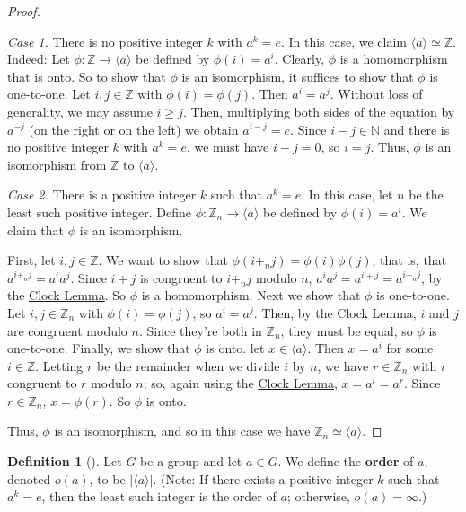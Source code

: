 \documentclass[10pt,]{book}
\newcommand{\terminology}[1]{\textbf{#1}}
\theoremstyle{plain}
\theoremstyle{definition}
\newtheorem{definition}[theorem]{Definition}
\theoremstyle{definition}
\theoremstyle{definition}
\theoremstyle{definition}
\numberwithin{equation}{section}
\def\Z{\mathbb{Z}}
\def\N{\mathbb{N}}
\begin{document}
\begin{proof}\hypertarget{proof-23}{}
\emph{Case 1.} There is no positive integer \(k\) with \(a^k=e\). In this case, we claim \(\langle a\rangle \simeq \Z\). Indeed: Let \(\phi:\Z\to \langle a\rangle\) be defined by \(\phi(i)=a^i\). Clearly, \(\phi\) is a homomorphism that is onto. So to show that \(\phi\) is an isomorphism, it suffices to show that \(\phi\) is one-to-one. Let \(i,j\in \Z\) with \(\phi(i)=\phi(j)\). Then \(a^i=a^j\). Without loss of generality, we may assume \(i\geq j\). Then, multiplying both sides of the equation by \(a^{-j}\) (on the right or on the left) we obtain \(a^{i-j}=e\). Since \(i-j\in \N\) and there is no positive integer \(k\) with \(a^k=e\), we must have \(i-j=0\), so \(i=j\). Thus, \(\phi\) is an isomorphism from \(\Z\) to \(\langle a\rangle\).%
\par
\emph{Case 2.}  There is a positive integer \(k\) such that \(a^k=e\). In this case, let \(n\) be the least such positive integer. Define \(\phi:\Z_n\to \langle a\rangle\) be defined by \(\phi(i)=a^i\). We claim that \(\phi\) is an isomorphism.%
\par
First, let \(i,j\in \Z\). We want to show that \(\phi(i+_nj)=\phi(i)\phi(j)\), that is, that \(a^{i+_nj}=a^ia^j\). Since \(i+j\) is congruent to \(i+_nj\) modulo \(n\), \(a^ia^j=a^{i+j}=a^{i+_nj}\), by the \hyperref[clock]{Clock Lemma}. So \(\phi\) is a homomorphism. Next we show that \(\phi\) is one-to-one. Let \(i,j\in \Z_n\) with \(\phi(i)=\phi(j)\), so \(a^i=a^j\). Then, by the Clock Lemma, \(i\) and \(j\) are congruent modulo \(n\). Since they're both in \(\Z_n\), they must be equal, so \(\phi\) is one-to-one. Finally, we show that \(\phi\) is onto. let \(x\in \langle a\rangle\). Then \(x=a^i\) for some \(i\in \Z\). Letting \(r\) be the remainder when we divide \(i\) by \(n\), we have \(r\in \Z_n\) with \(i\) congruent to \(r\) modulo \(n\); so, again using the \hyperref[clock]{Clock Lemma}, \(x=a^i=a^r\). Since \(r\in \Z_n\), \(x=\phi(r)\). So \(\phi\) is onto.%
\par
Thus, \(\phi\) is an isomorphism, and so in this case we have \(\Z_n \simeq \langle a \rangle\).%
\end{proof}
\begin{definition}[{}]\label{definition-40}
Let \(G\) be a group and let \(a\in G\). We define the \terminology{order} of \(a\), denoted \(o(a)\), to be \(|\langle a\rangle |\). (Note: If there exists a positive integer \(k\) such that \(a^k=e\), then the least such integer is the order of \(a\); otherwise, \(o(a)=\infty\).)%
\end{definition}
\end{document}
